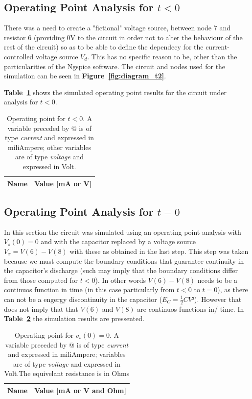 \subsection{Operating Point Analysis for $t<0$}
There was a need to create a "fictional" voltage source, between node 7 and resistor 6 (providing 0V to the circuit in order not to alter the behaviour of the rest of the circuit) so as to be able to define the dependecy for the current-controlled voltage source {\it $V_d$}. This has no specific reason to be, other than the particularities of the Ngspice software. The circuit and nodes used for the simulation can be seen in \textbf{Figure~\ref{fig:diagram_t2}}.\par 
\textbf{Table~\ref{tab:op}} shows the simulated operating point results for the circuit
under analysis for $t<0$. 

\begin{table}[h!]
  \centering
  \begin{tabular}{|l|r|}
    \hline    
    {\bf Name} & {\bf Value [mA or V]} \\ \hline
    
  \end{tabular}
  \caption{Operating point for $t<0$. A variable preceded by @ is of type {\em current}
    and expressed in miliAmpere; other variables are of type {\it voltage} and expressed in
    Volt.}
  \label{tab:op}
\end{table}

\pagebreak
\subsection{Operating Point Analysis for $t=0$}
In this section the circuit was simulated using an operating point analysis with $V_s(0) = 0$ and 
with the capacitor replaced by a voltage source {\it $V_x=V(6)-V(8)$} with these as obtained in the last step. This step was taken because we must compute the boundary conditions that guarantee continuity in the capacitor's discharge (such may imply that the boundary conditions differ from those computed for $t<0$). In other words $V(6)-V(8)$ needs to be a continuos function in time (in this case particularly from $t<0$ to $t=0$), as there can not be a engergy discontinuity in the capacitor ($E_C=\frac{1}{2}CV²$). However that does not imply that that $V(6)$ and $V(8)$ are continuos functions in/ time.
In \textbf{Table~\ref{tab:opeq}} the simulation results are pressented. 
\begin{table}[h!]
  \centering
  \begin{tabular}{|l|r|}
    \hline    
    {\bf Name} & {\bf Value [mA or V and Ohm]} \\ \hline
    
  \end{tabular} 
  \caption{Operating point for {\it $v_s(0)=0$}. A variable preceded by @ is of type {\em current}
    and expressed in miliAmpere; variables are of type {\it voltage} and expressed in
    Volt.The equivelant resistance is in Ohms}
  \label{tab:opeq}
\end{table}

